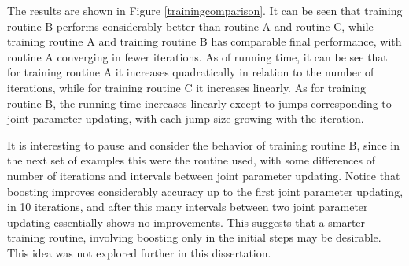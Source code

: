 The results are shown in Figure \ref{trainingcomparison}.  It can be seen that training routine B performs considerably better than routine A and routine C, while training routine A and training routine B has comparable final performance, with routine A converging in fewer iterations. As of running time, it can be see that for training routine A it increases quadratically in relation to the number of iterations, while for training routine C it increases linearly. As for training routine B, the running time increases linearly except to jumps corresponding to joint parameter updating, with each jump size growing with the iteration.

It is interesting to pause and consider the behavior of training routine B, since in the next set of examples this were the routine used, with some differences of number of iterations and intervals between joint parameter updating. Notice that boosting improves considerably accuracy up to the first joint parameter updating, in 10 iterations, and after this many intervals between two joint parameter updating essentially shows no improvements. This suggests that a smarter training routine, involving boosting only in the initial steps may be desirable. This idea was not explored further in this dissertation.

